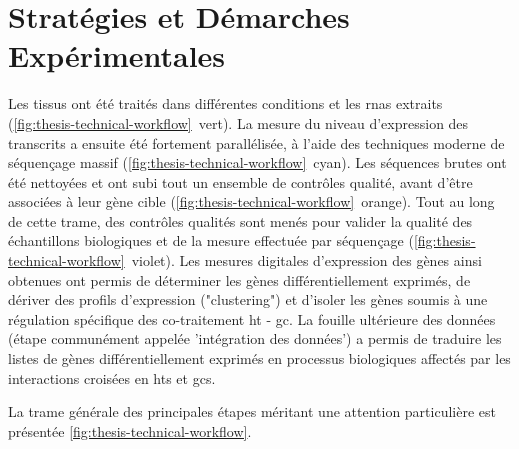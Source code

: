 \documentclass[../main.tex]{subfiles}
\begin{document}
\chapter{Stratégies et Démarches Expérimentales}


Les tissus ont été traités dans différentes conditions et les \glspl{rna} extraits (\autoref{fig:thesis-technical-workflow}~vert).
La mesure du niveau d'expression des transcrits a ensuite été fortement parallélisée, à l'aide des techniques moderne de séquençage massif (\autoref{fig:thesis-technical-workflow}~cyan).
Les séquences brutes ont été nettoyées et ont subi tout un ensemble de contrôles qualité, avant d'être associées à leur gène cible (\autoref{fig:thesis-technical-workflow}~orange).
Tout au long de cette trame, des contrôles qualités sont menés pour valider la qualité des échantillons biologiques et de la mesure effectuée par séquençage (\autoref{fig:thesis-technical-workflow}~violet).
Les mesures digitales d'expression des gènes ainsi obtenues ont permis de déterminer les gènes différentiellement exprimés, de dériver des profils d'expression ("clustering") et d'isoler les gènes soumis à une régulation spécifique des co-traitement \gls{ht} - \gls{gc}.
La fouille ultérieure des données (étape communément appelée 'intégration des données') a permis de traduire les listes de gènes différentiellement exprimés en processus biologiques affectés par les interactions croisées en \glspl{ht} et \glspl{gc}. 


La trame générale des principales étapes méritant une attention particulière est présentée \autoref{fig:thesis-technical-workflow}.


\end{document}
